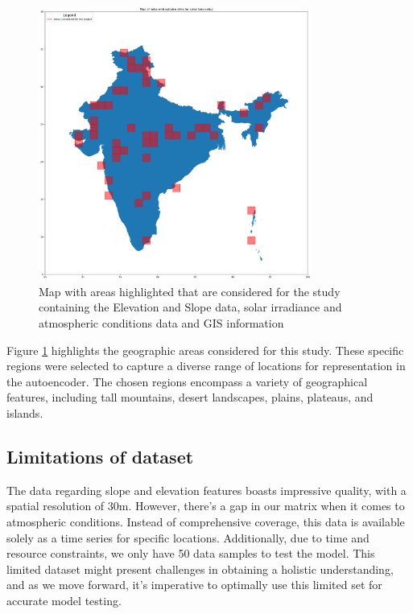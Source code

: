 \documentclass[a4paper,12pt]{Classes/RoboticsLaTeX}
\begin{document}
	\begin{figure}[H]
		\centering
		\includegraphics[width=0.8\textwidth]{Figures/india_map_with_highlighted_data.png} %
		\caption{Map with areas highlighted that are considered for the study containing the Elevation and Slope data, solar irradiance and atmospheric conditions data and GIS information}
		\label{fig:my_label9} %
	\end{figure}


	Figure \ref{fig:my_label9} highlights the geographic areas considered for this study. These specific 
	regions were selected to capture a diverse range of locations for representation in the autoencoder. 
	The chosen regions encompass a variety of geographical features, including tall mountains, desert 
	landscapes, plains, plateaus, and islands.


	\subsection{Limitations of dataset}

	The data regarding slope and elevation features boasts impressive quality, with a spatial resolution of 30m. However, there's a gap in our matrix when it comes
	 to atmospheric conditions. Instead of comprehensive coverage, this data is available solely as a time series for specific locations. Additionally, due to time and 
	 resource constraints, we only have 50 data samples to test the model. This limited dataset might 
	 present challenges in obtaining a holistic understanding, and as we move forward, it's imperative 
	 to optimally use this limited set for accurate model testing.
	 
\end{document}
